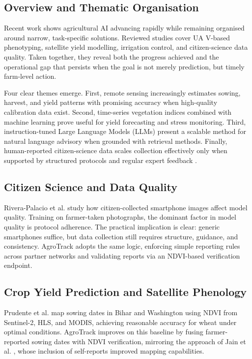 \documentclass[10pt,twocolumn,letterpaper]{article}
\begin{document}
\subsection{Overview and Thematic Organisation}
Recent work shows agricultural AI advancing rapidly while remaining organised around narrow, task-specific solutions. Reviewed studies cover UA V-based phenotyping, satellite yield modelling, irrigation control, and citizen-science data quality. Taken together, they reveal both the progress achieved and the operational gap that persists when the goal is not merely prediction, but timely farm-level action.

Four clear themes emerge. First, remote sensing increasingly estimates sowing, harvest, and yield patterns with promising accuracy when high-quality calibration data exist. Second, time-series vegetation indices combined with machine learning prove useful for yield forecasting and stress monitoring. Third, instruction-tuned Large Language Models (LLMs) present a scalable method for natural language advisory when grounded with retrieval methods. Finally, human-reported citizen-science data scales collection effectively only when supported by structured protocols and regular expert feedback \cite{RiveraPalacio_2025}.

\subsection{Citizen Science and Data Quality}
Rivera-Palacio et al. \cite{RiveraPalacio_2025} study how citizen-collected smartphone images affect model quality. Training on farmer-taken photographs, the dominant factor in model quality is protocol adherence. The practical implication is clear: generic smartphones suffice, but data collection still requires structure, guidance, and consistency. AgroTrack adopts the same logic, enforcing simple reporting rules across partner networks and validating reports via an NDVI-based verification endpoint.

\subsection{Crop Yield Prediction and Satellite Phenology}
Prudente et al. \cite{Prudente_2025} map sowing dates in Bihar and Washington using NDVI from Sentinel-2, HLS, and MODIS, achieving reasonable accuracy for wheat under optimal conditions. AgroTrack improves on this baseline by fusing farmer-reported sowing dates with NDVI verification, mirroring the approach of Jain et al. \cite{Jain_2016}, whose inclusion of self-reports improved mapping capabilities.
\end{document}
